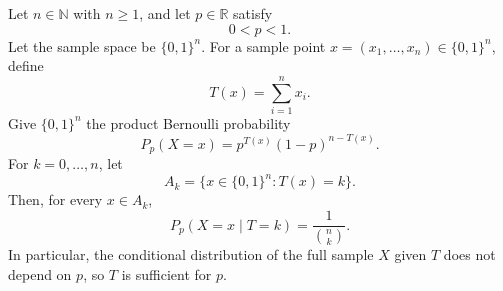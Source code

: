 \begin{theorem}
Let $n\in\mathbb{N}$ with $n\ge 1$, and let $p\in\mathbb{R}$ satisfy
\[
0<p<1.
\]
Let the sample space be $\{0,1\}^n$. For a sample point
$x=(x_1,\ldots,x_n)\in\{0,1\}^n$, define
\[
T(x)=\sum_{i=1}^n x_i.
\]
Give $\{0,1\}^n$ the product Bernoulli probability
\[
P_p(X=x)
=
p^{T(x)}(1-p)^{n-T(x)}.
\]
For $k=0,\ldots,n$, let
\[
A_k=\{x\in\{0,1\}^n:T(x)=k\}.
\]
Then, for every $x\in A_k$,
\[
P_p(X=x\mid T=k)=\frac{1}{\binom{n}{k}}.
\]
In particular, the conditional distribution of the full sample $X$ given
$T$ does not depend on $p$, so $T$ is sufficient for $p$.
\end{theorem}
